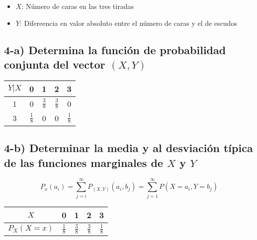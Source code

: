 \documentclass[12pt]{article}
\begin{document}
\begin{itemize}
    \item $X$: N\'umero de caras en las tres tiradas
    \item $Y$: Difereencia en valor absoluto entre el n\'umero de caras y el de escudos
\end{itemize}

\subsection*{4-a) Determina la funci\'on de probabilidad conjunta del vector $\left(X,Y\right)$}


\begin{center}
    \renewcommand{\arraystretch}{1.5}
    \begin{tabular}{|c|c|c|c|c|}
        \hline
        $Y|X$ & 0             & 1               & 2              & 3
        \\
        \hline
        1     & 0             & $  \frac{3}{8}$ & $\frac{3}{8} $ & 0
        \\
        \hline
        3     & $\frac{1}{8}$ & 0               & 0              & $\frac{1}{8}$
        \\
        \hline
    \end{tabular}
\end{center}


\subsection*{4-b) Determinar la media y al desviaci\'on t\'ipica de las funciones marginales  de $X$ y  $Y$ }

\begin{equation*}
    P_x \left(a_i\right) = \sum_{j=i}^{\infty} P_{\left(X,Y\right)}\left(a_i,b_j\right) = \sum_{j=1}^{\infty} P \left(X =a_i , Y = b_j\right)
\end{equation*}


\begin{center}
    \renewcommand{\arraystretch}{1.5}
    \begin{tabular}{|c|c|c|c|c|}
        \hline
        $X$                   & 0             & 1             & 2             & 3
        \\
        \hline
        $P_X\left(X=x\right)$ & $\frac{1}{8}$ & $\frac{3}{8}$ & $\frac{3}{8}$ & $\frac{1}{8}$
        \\
        \hline
    \end{tabular}
\end{center}
\end{document}
